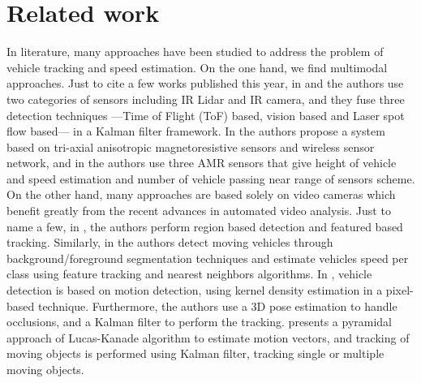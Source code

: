 \section{Related work}
\label{sec:related}

In literature, many approaches have been studied to address the problem of vehicle tracking and speed estimation. On the one hand, we find multimodal approaches. Just to cite a few works published this year, in \cite{tian2017reliable} and \cite{tian2017self} the authors use two categories of sensors including IR Lidar and IR camera, and they fuse three detection techniques ---Time of Flight (ToF) based, vision based and Laser spot flow based--- in a Kalman filter framework. In \cite{wei2017adaptable} the authors propose a system based on tri-axial anisotropic magnetoresistive sensors and wireless sensor network, and in \cite{jinturkar2016real} the authors use three AMR sensors that give height of vehicle and speed estimation and number of vehicle passing near range of sensors scheme.\\

\noindent On the other hand, many approaches are based solely on video cameras which  benefit greatly from the recent advances in automated video analysis. Just to name a few, in \cite{zaki2017demonstrating}, the authors perform region based detection and featured based tracking. Similarly, in \cite{yabo2016vehicle} the authors detect moving vehicles through background/foreground segmentation techniques and estimate vehicles speed per class using feature tracking and nearest neighbors algorithms. In \cite{khilar2016novel}, vehicle detection is based on motion detection, using kernel density estimation in a pixel-based technique. Furthermore, the authors use a 3D pose estimation to handle occlusions, and a Kalman filter to perform the tracking. \cite{moremoving} presents a pyramidal approach of Lucas-Kanade algorithm to estimate motion vectors, and tracking of moving objects is performed using Kalman filter, tracking single or multiple moving objects. 

